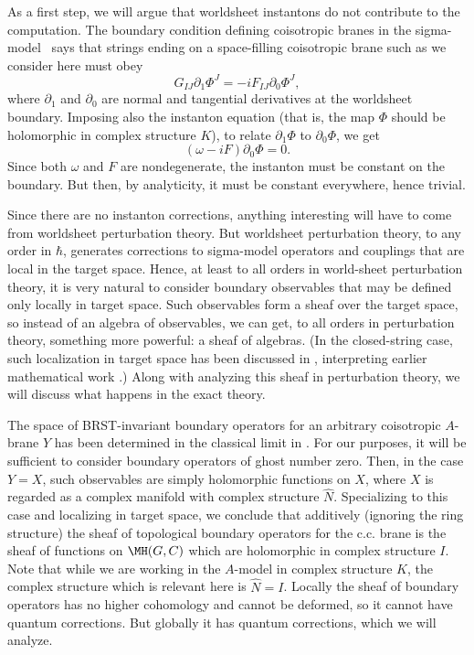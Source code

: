 As a first step, we will argue that worldsheet instantons do not
contribute to the computation. The boundary condition defining
coisotropic branes in the sigma-model \cite{ref80}\ says that strings
ending on a space-filling coisotropic brane such as we consider
here must obey %
\setcounter{equation}{5}
\begin{equation}\label{eq:melbo}
G_{IJ}\partial_1\Phi^J=-i
F_{IJ}\partial_0\Phi^J,
\end{equation}
 where $\partial_1$ and $\partial_0$ are
normal and tangential derivatives at the worldsheet boundary.
Imposing also the instanton equation (that is, the map $\Phi$
should be holomorphic in complex structure $K$), to relate
$\partial_1\Phi$ to $\partial_0 \Phi$, we get %
\setcounter{equation}{6}
\begin{equation}\label{eq:zimbolo}
(\omega-iF)\partial_0\Phi=0.
\end{equation}
 Since both $\omega$ and $F$ are
nondegenerate, the instanton must be constant on the boundary. But
then, by analyticity, it must be constant everywhere, hence
trivial.

Since there are no instanton corrections, anything interesting
will have to come from worldsheet perturbation theory.  But
worldsheet perturbation theory, to any order in $\hbar$, generates
corrections to sigma-model operators and couplings that are local
in the target space. Hence, at least to all orders in world-sheet
perturbation theory, it is very natural to consider boundary
observables that may be defined only locally in target space. Such
observables form a sheaf over the target space, so instead of an
algebra of observables, we can get, to all orders in perturbation
theory, something more powerful: a sheaf of algebras. (In the
closed-string case, such localization in target space has been
discussed in \cite{ref133,ref134,ref135}, interpreting earlier
mathematical work \cite{ref136}.) Along with analyzing this
sheaf in perturbation theory, we will discuss what happens in the
exact theory.

The  space of BRST-invariant boundary operators for an arbitrary
coisotropic $A$-brane $Y$ has been determined in the classical
limit in \cite{ref80,ref132}. For our purposes, it will be
sufficient to consider boundary operators of ghost number zero.
Then, in the case $Y=X$, such observables are simply holomorphic
functions on $X$, where $X$ is regarded as a complex manifold with
complex structure $\hat N$. Specializing to this case and
localizing in target space, we conclude that additively (ignoring
the ring structure) the sheaf of topological boundary operators
for the c.c. brane is the sheaf of functions on $\MH(G,C)$ which
are holomorphic in complex structure $I$. Note that while we are
working in the $A$-model in complex structure $K$, the complex
structure which is relevant here is $\hat N=I$. Locally the sheaf
of boundary operators has no higher cohomology and cannot be
deformed, so it cannot have quantum corrections. But globally it
has quantum corrections, which we will analyze.

